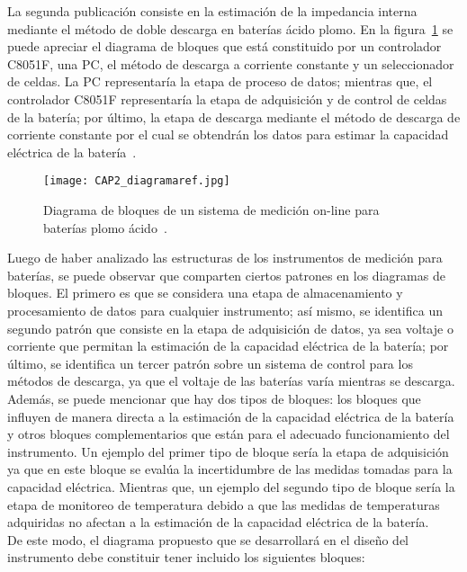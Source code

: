 La segunda publicación consiste en la estimación de la impedancia interna mediante el método de doble descarga en baterías ácido plomo. En la figura~\ref{fig:diagramaref} se puede apreciar el diagrama de bloques que está constituido por un controlador C8051F, una PC, el método de descarga a corriente constante y un seleccionador de celdas. La PC representaría la etapa de proceso de datos; mientras que, el controlador C8051F representaría la etapa de adquisición y de control de celdas de la batería; por último, la etapa de descarga mediante el método de descarga de corriente constante por el cual se obtendrán los datos para estimar la capacidad eléctrica de la batería~\cite{Ping2012}. 

\begin{figure}[!ht]
\begin{center}
\texttt{[image: CAP2\_diagramaref.jpg]}
\caption{Diagrama de bloques de un sistema de medición on-line para baterías plomo ácido~\cite{Ping2012}.}
\label{fig:diagramaref}
\end{center}
\end{figure}

Luego de haber analizado las estructuras de los instrumentos de medición para baterías, se puede observar que comparten ciertos patrones en los diagramas de bloques. El primero es que se considera una etapa de almacenamiento y procesamiento de datos para cualquier instrumento; así mismo, se identifica un segundo patrón que consiste en la etapa de adquisición de datos, ya sea voltaje o corriente que permitan la estimación de la capacidad eléctrica de la batería; por último, se identifica un tercer patrón sobre un sistema de control para los métodos de descarga, ya que el voltaje de las baterías varía mientras se descarga. Además, se puede mencionar que hay dos tipos de bloques: los bloques que influyen de manera directa a la estimación de la capacidad eléctrica de la batería y otros bloques complementarios que están para el adecuado funcionamiento del instrumento. Un ejemplo del primer tipo de bloque sería la etapa de adquisición ya que en este bloque se evalúa la incertidumbre de las medidas tomadas para la capacidad eléctrica. Mientras que, un ejemplo del segundo tipo de bloque sería la etapa de monitoreo de temperatura debido a que las medidas de temperaturas adquiridas no afectan a la estimación de la capacidad eléctrica de la batería. \\

De este modo, el diagrama propuesto que se desarrollará en el diseño del instrumento debe constituir tener incluido los siguientes bloques:

